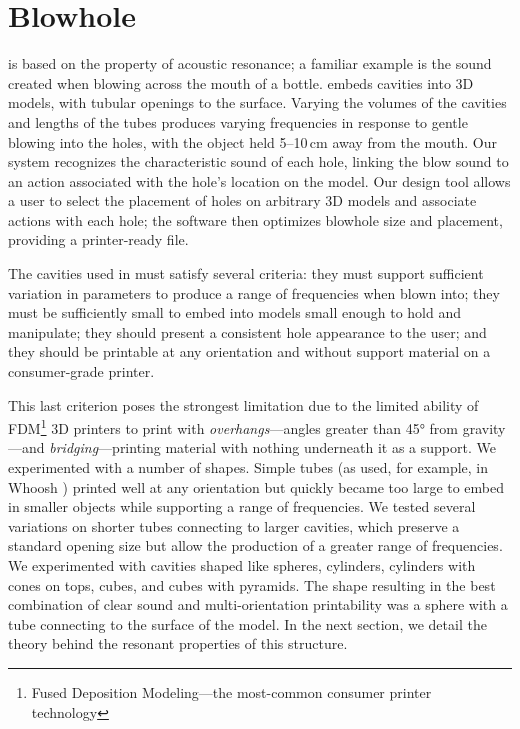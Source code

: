   \section{Blowhole}
    \bh is based on the property of acoustic resonance; a familiar example is
    the sound created when blowing across the mouth of a bottle. \bh embeds
    cavities into 3D models, with tubular openings to the surface. Varying the
    volumes of the cavities and lengths of the tubes produces varying
    frequencies in response to gentle blowing into the holes, with the object
    held 5--10\,cm away from the mouth. Our system recognizes the characteristic
    sound of each hole, linking the blow sound to an action associated with the
    hole's location on the model. Our design tool allows a user to select the
    placement of holes on arbitrary 3D models and associate actions with each
    hole; the software then optimizes blowhole size and placement, providing a
    printer-ready file.
    
    The cavities used in \bh must satisfy several criteria: they must support
    sufficient variation in parameters to produce a range of frequencies when
    blown into; they must be sufficiently small to embed into models small
    enough to hold and manipulate; they should present a consistent hole
    appearance to the user; and they should be printable at any orientation and
    without support material on a consumer-grade printer.
    
    This last criterion poses the strongest limitation due to the limited
    ability of FDM\footnote{Fused Deposition Modeling---the most-common consumer
    printer technology} 3D printers to print with \textit{overhangs}---angles
    greater than 45° from gravity---and \textit{bridging}---printing
    material with nothing underneath it as a support. We experimented with a
    number of shapes. Simple tubes (as used, for example, in Whoosh
    \cite{Reyes:2016}) printed well at any orientation but quickly became too
    large to embed in smaller objects while supporting a range of frequencies.
    We tested several variations on shorter tubes connecting to larger cavities,
    which preserve a standard opening size but allow the production of a greater
    range of frequencies. We experimented with cavities shaped like spheres,
    cylinders, cylinders with cones on tops, cubes, and cubes with pyramids. The
    shape resulting in the best combination of clear sound and multi-orientation
    printability was a sphere with a tube connecting to the surface of the
    model. In the next section, we detail the theory behind the resonant
    properties of this structure.

